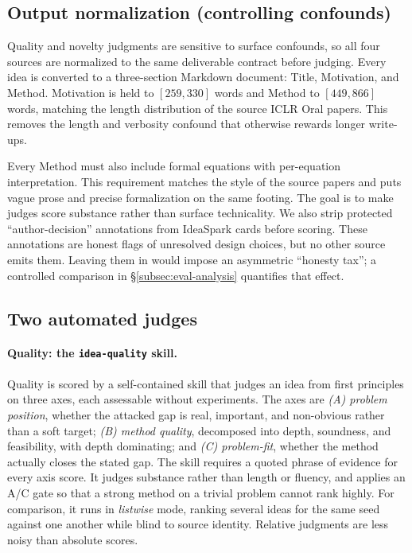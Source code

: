 \documentclass[10pt,a4paper]{article}
\begin{document}
\subsection{Output normalization (controlling confounds)}
\label{subsec:eval-norm}

Quality and novelty judgments are sensitive to surface confounds, so all four sources are normalized to the same deliverable contract before judging. Every idea is converted to a three-section Markdown document: Title, Motivation, and Method. Motivation is held to $[259,330]$ words and Method to $[449,866]$ words, matching the length distribution of the source ICLR Oral papers. This removes the length and verbosity confound that otherwise rewards longer write-ups.

Every Method must also include formal equations with per-equation interpretation. This requirement matches the style of the source papers and puts vague prose and precise formalization on the same footing. The goal is to make judges score substance rather than surface technicality. We also strip protected ``author-decision'' annotations from IdeaSpark cards before scoring. These annotations are honest flags of unresolved design choices, but no other source emits them. Leaving them in would impose an asymmetric ``honesty tax''; a controlled comparison in \S\ref{subsec:eval-analysis} quantifies that effect.

\subsection{Two automated judges}
\label{subsec:eval-judges}

\paragraph{Quality: the \texttt{idea-quality} skill.} Quality is scored by a self-contained skill that judges an idea from first principles on three axes, each assessable without experiments. The axes are \emph{(A) problem position}, whether the attacked gap is real, important, and non-obvious rather than a soft target; \emph{(B) method quality}, decomposed into depth, soundness, and feasibility, with depth dominating; and \emph{(C) problem-fit}, whether the method actually closes the stated gap. The skill requires a quoted phrase of evidence for every axis score. It judges substance rather than length or fluency, and applies an A/C gate so that a strong method on a trivial problem cannot rank highly. For comparison, it runs in \emph{listwise} mode, ranking several ideas for the same seed against one another while blind to source identity. Relative judgments are less noisy than absolute scores.
\end{document}
